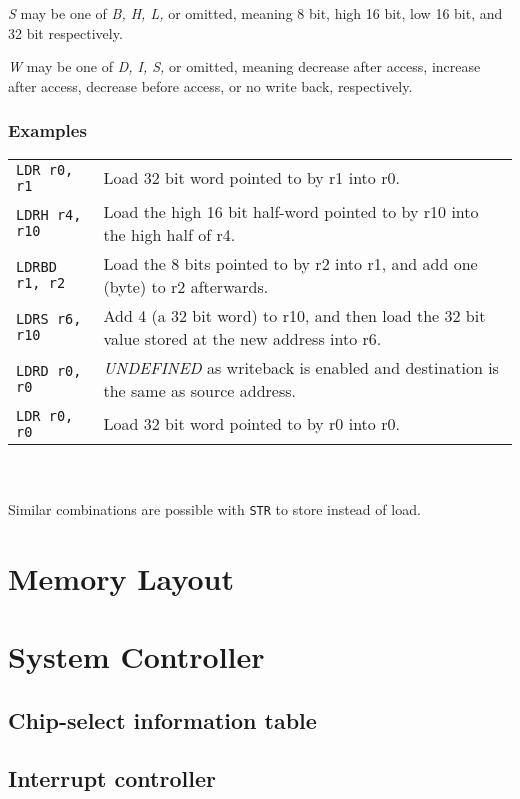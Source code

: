 \documentclass[a4paper,twoside,openany]{book}
\begin{document}
	\emph{S} may be one of \emph{B, H, L,} or omitted, meaning 8 bit, high 16 bit,
	low 16 bit, and 32 bit respectively.

	\emph{W} may be one of \emph{D, I, S, } or omitted, meaning decrease after access,
	increase after access, decrease before access, or no write back,
	respectively.

	\subsection*{Examples}
	  \begin{tabular}{l l}
            \texttt{LDR r0, r1} & Load 32 bit word pointed to by r1 into r0. \\
	    \texttt{LDRH r4, r10} & Load the high 16 bit half-word pointed to
	                            by r10 into the high half of r4. \\
            \texttt{LDRBD r1, r2} & Load the 8 bits pointed to by r2 into r1,
	                            and add one (byte) to r2 afterwards. \\
            \texttt{LDRS r6, r10} & Add 4 (a 32 bit word) to r10, and then load
	                            the 32 bit value stored at the new address
				    into r6. \\
	    \texttt{LDRD r0, r0}  & \emph{UNDEFINED} as writeback is enabled
	                            and destination is the same as source
				    address. \\
	    \texttt{LDR r0, r0}   & Load 32 bit word pointed to by r0 into r0.
	  \end{tabular}
          \\
	  \\
	  Similar combinations are possible with \texttt{STR} to store instead
	  of load.
    

  \chapter{Memory Layout}
  
  \chapter{System Controller}
    \section{Chip-select information table}
    \section{Interrupt controller}
\end{document}
